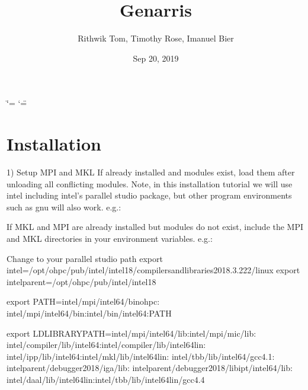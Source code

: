 \documentclass[letterpaper,10pt,english]{sphinxmanual}
\title{Genarris}
\date{Sep 20, 2019}
\author{Rithwik Tom, Timothy Rose, Imanuel Bier}
\begin{document}
\ifdefined\shorthandoff
  \ifnum\catcode`\=\string=\active\shorthandoff{=}\fi
  \ifnum\catcode`\"=\active{}\fi
\fi

\pagestyle{empty}
\sphinxmaketitle
\pagestyle{plain}
\sphinxtableofcontents
\pagestyle{normal}
\label{\detokenize{index::doc}}



\chapter{Installation}
\label{\detokenize{index:installation}}
1) Setup MPI and MKL
If already installed and modules exist, load them after unloading all conflicting modules. Note, in this installation tutorial we will use intel including intel's parallel studio package, but other program environments such as gnu will also work.
e.g.:

\begin{sphinxVerbatim}[commandchars=\\\{\}]
  
  
  
  
\end{sphinxVerbatim}

If MKL and MPI are already installed but modules do not exist, include the MPI and MKL directories in your environment variables.
e.g.:

\begin{sphinxVerbatim}[commandchars=\\\{\}]
\PYGZsh{}Change to your parallel studio path
export \PYGZdl{}intel=/opt/ohpc/pub/intel/intel18/compilers\PYGZus{}and\PYGZus{}libraries\PYGZus{}2018.3.222/linux
export \PYGZdl{}intel\PYGZus{}parent=/opt/ohpc/pub/intel/intel18

export PATH=\PYGZdq{}\PYGZdl{}intel/mpi/intel64/bin\PYGZus{}ohpc:\PYGZbs{}
\PYGZdl{}intel/mpi/intel64/bin:\PYGZdl{}intel/bin/intel64:\PYGZdl{}PATH\PYGZdq{}

export LD\PYGZus{}LIBRARY\PYGZus{}PATH=\PYGZdq{}\PYGZdl{}intel/mpi/intel64/lib:\PYGZdl{}intel/mpi/mic/lib:\PYGZbs{}
\PYGZdl{}intel/compiler/lib/intel64:\PYGZdl{}intel/compiler/lib/intel64\PYGZus{}lin:\PYGZbs{}
\PYGZdl{}intel/ipp/lib/intel64:\PYGZdl{}intel/mkl/lib/intel64\PYGZus{}lin:\PYGZbs{}
\PYGZdl{}intel/tbb/lib/intel64/gcc4.1:\PYGZbs{}
\PYGZdl{}intel\PYGZus{}parent/debugger\PYGZus{}2018/iga/lib:\PYGZbs{}
\PYGZdl{}intel\PYGZus{}parent/debugger\PYGZus{}2018/libipt/intel64/lib:\PYGZbs{}
\PYGZdl{}intel/daal/lib/intel64\PYGZus{}lin:\PYGZdl{}intel/tbb/lib/intel64\PYGZus{}lin/gcc4.4\PYGZdq{}
\end{sphinxVerbatim}
\end{document}
